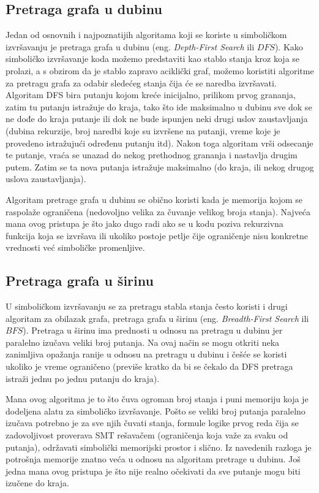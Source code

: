 \documentclass[12pt,oneside]{memoir}
\begin{document}
\bigbreak

\subsection{Pretraga grafa u dubinu} \label{DFS}
Jedan od osnovnih i najpoznatijih algoritama koji se koriste u simboličkom izvršavanju je pretraga grafa u dubinu (eng. \textit{Depth-First Search} ili $DFS$). Kako simboličko izvršavanje koda možemo predstaviti kao stablo stanja kroz koja se prolazi, a s obzirom da je stablo zapravo aciklički graf, možemo koristiti algoritme za pretragu grafa za odabir sledećeg stanja čija će se naredba izvršavati. Algoritam DFS bira putanju kojom kreće inicijalno, prilikom prvog grananja, zatim tu putanju istražuje do kraja, tako što ide maksimalno u dubinu sve dok se ne dođe do kraja putanje ili dok ne bude ispunjen neki drugi uslov zaustavljanja (dubina rekurzije, broj naredbi koje su izvršene na putanji, vreme koje je provedeno istražujući određenu putanju itd). Nakon toga algoritam vrši odsecanje te putanje, vraća se unazad do nekog prethodnog grananja i nastavlja drugim putem. Zatim se ta nova putanja istražuje maksimalno (do kraja, ili nekog drugog uslova zaustavljanja). 

Algoritam pretrage grafa u dubinu se obično koristi kada je memorija kojom se raspolaže ograničena (nedovoljno velika za čuvanje velikog broja stanja). Najveća mana ovog pristupa je što jako dugo radi ako se u kodu poziva rekurzivna funkcija koja se izvršava ili ukoliko postoje petlje čije ograničenje nisu konkretne vrednosti već simboličke promenljive. 

\bigbreak

\subsection{Pretraga grafa u širinu} \label{BFS}
U simboličkom izvršavanju se za pretragu stabla stanja često koristi i drugi algoritam za obilazak grafa, pretraga grafa u širinu (eng. \textit{Breadth-First Search} ili $BFS$). Pretraga u širinu ima prednosti u odnosu na pretragu u dubinu jer paralelno izučava veliki broj putanja. Na ovaj način se mogu otkriti neka zanimljiva opažanja ranije u odnosu na pretragu u dubinu i češće se koristi ukoliko je vreme ograničeno (previše kratko da bi se čekalo da DFS pretraga istraži jednu po jednu putanju do kraja). 

Mana ovog algoritma je to što čuva ogroman broj stanja i puni memoriju koja je dodeljena alatu za simboličko izvršavanje. Pošto se veliki broj putanja paralelno izučava potrebno je za sve njih čuvati stanja, formule logike prvog reda čija se zadovoljivost proverava SMT rešavačem (ograničenja koja važe za svaku od putanja), održavati simbolički memorijski prostor i slično. Iz navedenih razloga je potrošnja memorije znatno veća u odnosu na algoritam pretrage u dubinu. Još jedna mana ovog pristupa je što nije realno očekivati da sve putanje mogu biti izučene do kraja. 
\end{document}

